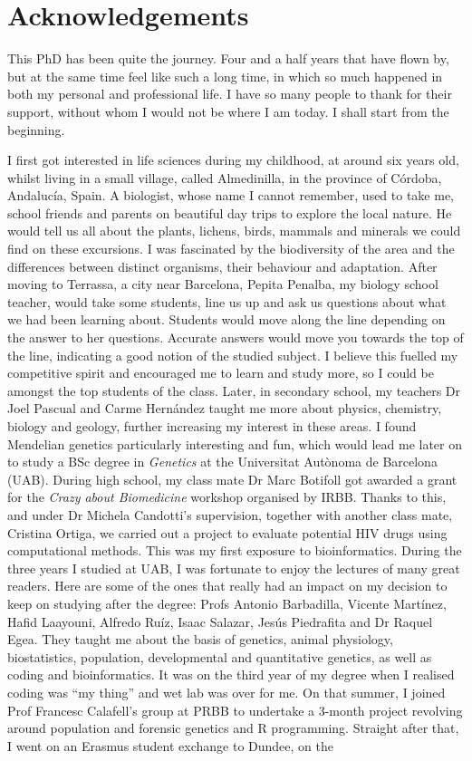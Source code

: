 \chapter*{Acknowledgements} %

This PhD has been quite the journey. Four and a half years that have flown by, but at the same time feel like such a long time, in which so much happened in both my personal and professional life. I have so many people to thank for their support, without whom I would not be where I am today. I shall start from the beginning.

I first got interested in life sciences during my childhood, at around six years old, whilst living in a small village, called Almedinilla, in the province of Córdoba, Andalucía, Spain. A biologist, whose name I cannot remember, used to take me, school friends and parents on beautiful day trips to explore the local nature. He would tell us all about the plants, lichens, birds, mammals and minerals we could find on these excursions. I was fascinated by the biodiversity of the area and the differences between distinct organisms, their behaviour and adaptation. After moving to Terrassa, a city near Barcelona, Pepita Penalba, my biology school teacher, would take some students, line us up and ask us questions about what we had been learning about. Students would move along the line depending on the answer to her questions. Accurate answers would move you towards the top of the line, indicating a good notion of the studied subject. I believe this fuelled my competitive spirit and encouraged me to learn and study more, so I could be amongst the top students of the class. Later, in secondary school, my teachers Dr Joel Pascual and Carme Hernández taught me more about physics, chemistry, biology and geology, further increasing my interest in these areas. I found Mendelian genetics particularly interesting and fun, which would lead me later on to study a BSc degree in \textit{Genetics} at the Universitat Autònoma de Barcelona (UAB). During high school, my class mate Dr Marc Botifoll got awarded a grant for the \textit{Crazy about Biomedicine} workshop organised by IRBB. Thanks to this, and under Dr Michela Candotti's supervision, together with another class mate, Cristina Ortiga, we carried out a project to evaluate potential HIV drugs using computational methods. This was my first exposure to bioinformatics. During the three years I studied at UAB, I was fortunate to enjoy the lectures of many great readers. Here are some of the ones that really had an impact on my decision to keep on studying after the degree: Profs Antonio Barbadilla, Vicente Martínez, Hafid Laayouni, Alfredo Ruíz, Isaac Salazar, Jesús Piedrafita and Dr Raquel Egea. They taught me about the basis of genetics, animal physiology, biostatistics, population, developmental and quantitative genetics, as well as coding and bioinformatics. It was on the third year of my degree when I realised coding was ``my thing'' and wet lab was over for me. On that summer, I joined Prof Francesc Calafell's group at PRBB to undertake a 3-month project revolving around population and forensic genetics and R programming. Straight after that, I went on an Erasmus student exchange to Dundee, on the 